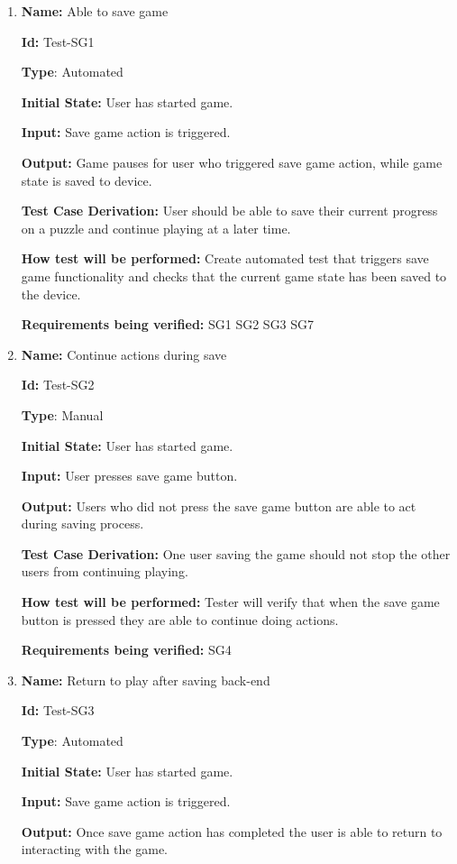 \documentclass[12pt, titlepage]{article}
\begin{document}
\begin{enumerate}

\item{\textbf{Name:} Able to save game}

\textbf{Id:} Test-SG1

\textbf{Type}: Automated

\textbf{Initial State:} User has started game.

\textbf{Input:} Save game action is triggered.

\textbf{Output:}  Game pauses for user who triggered save game action, while game state is saved to device.

\textbf{Test Case Derivation:} User should be able to save their current progress on a puzzle and continue playing at a later time.

\textbf{How test will be performed:} Create automated test that triggers save game functionality and checks that the current game state has been saved to the device.

\textbf{Requirements being verified: } SG1 SG2 SG3 SG7

\item{\textbf{Name:} Continue actions during save}

\textbf{Id:} Test-SG2

\textbf{Type}: Manual

\textbf{Initial State:} User has started game.

\textbf{Input:} User presses save game button.

\textbf{Output:} Users who did not press the save game button are able to act during saving process.

\textbf{Test Case Derivation:} One user saving the game should not stop the other users from continuing playing.

\textbf{How test will be performed:} Tester will verify that when the save game button is pressed they are able to continue doing actions.

\textbf{Requirements being verified: } SG4

\item{\textbf{Name:} Return to play after saving back-end}

\textbf{Id:} Test-SG3

\textbf{Type}: Automated

\textbf{Initial State:} User has started game.

\textbf{Input:} Save game action is triggered.

\textbf{Output:} Once save game action has completed the user is able to return to interacting with the game.


\end{enumerate}
\end{document}

